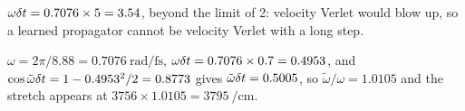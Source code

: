 $\omega\delta t = 0.7076\times5 = 3.54$, beyond
the limit of 2: velocity Verlet would blow up, so a learned propagator
cannot be velocity Verlet with a long step.

$\omega = 2\pi/8.88 =
\SI{0.7076}{\radian\per\femto\second}$, $\omega\delta t = 0.7076\times0.7 =
0.4953$, and $\cos\tilde\omega\delta t = 1 - 0.4953^2/2 = 0.8773$ gives
$\tilde\omega\delta t = 0.5005$, so $\tilde\omega/\omega = 1.0105$ and the
stretch appears at $3756\times1.0105 = \SI{3795}{\per\centi\metre}$.
